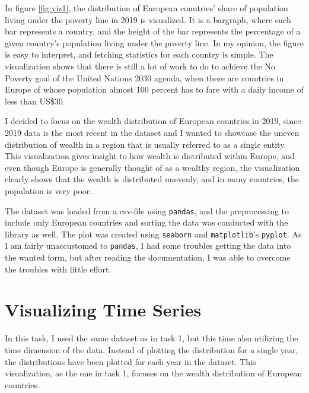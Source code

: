 \documentclass[11pt,a4paper,titlepage]{article}
\begin{document}
In figure \ref{fig:viz1}, the distribution of European countries' share of population living under the poverty line in 2019 is visualized. It is a bargraph, where each bar represents a country, and the height of the bar represents the percentage of a given country's population living under the poverty line. In my opinion, the figure is easy to interpret, and fetching statistics for each country is simple. The visualization shows that there is still a lot of work to do to achieve the No Poverty goal of the United Nations 2030 agenda, when there are countries in Europe of whose population almost 100 percent has to fare with a daily income of less than US\$30.

I decided to focus on the wealth distribution of European countries in 2019, since 2019 data is the most recent in the dataset and I wanted to showcase the uneven distribution of wealth in a region that is usually referred to as a single entity. This visualization gives insight to how wealth is distributed within Europe, and even though Europe is generally thought of as a wealthy region, the visualization clearly shows that the wealth is distributed unevenly, and in many countries, the population is very poor.

The dataset was loaded from a csv-file using \texttt{pandas}, and the preprocessing to include only European countries and sorting the data was conducted with the library as well. The plot was created using \texttt{seaborn} and \texttt{matplotlib}'s \texttt{pyplot}. As I am fairly unaccustomed to \texttt{pandas}, I had some troubles getting the data into the wanted form, but after reading the documentation, I was able to overcome the troubles with little effort.

\section{Visualizing Time Series}
In this task, I used the same dataset as in task 1, but this time also utilizing the time dimension of the data. Instead of plotting the distribution for a single year, the distributions have been plotted for each year in the dataset. This visualization, as the one in task 1, focuses on the wealth distribution of European countries.
\end{document}

